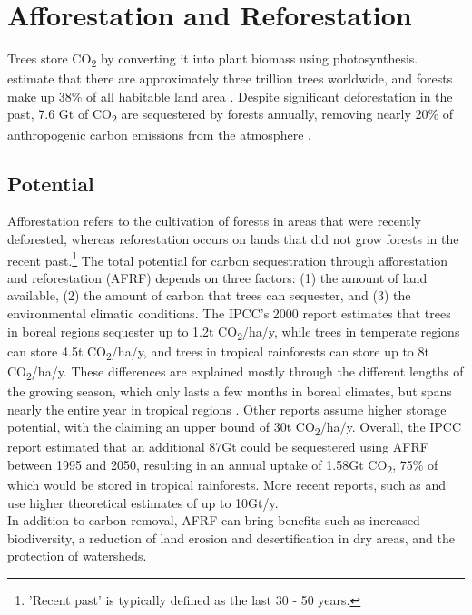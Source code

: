 \section{Afforestation and Reforestation}
Trees store CO\textsubscript{2} by converting it into plant biomass using photosynthesis. \textcite{Crowther2015MappingScale} estimate that there are approximately three trillion trees worldwide, and forests make up 38\% of all habitable land area \parencite{RitchieHowForested}. Despite significant deforestation in the past, 7.6 Gt of CO\textsubscript{2} are sequestered by forests annually, removing nearly 20\% of anthropogenic carbon emissions from the atmosphere \parencite{Harris2021GlobalFluxes}.
\subsection*{Potential}
Afforestation refers to the cultivation of forests in areas that were recently deforested, whereas reforestation occurs on lands that did not grow forests in the recent past.\footnote{'Recent past' is typically defined as the last 30 - 50 years.} The total potential for carbon sequestration through afforestation and reforestation (AFRF) depends on three factors: (1) the amount of land available, (2) the amount of carbon that trees can sequester, and (3) the environmental climatic conditions.
The IPCC's 2000 report estimates that trees in boreal regions sequester up to 1.2t CO\textsubscript{2}/ha/y, while trees in temperate regions can store 4.5t CO\textsubscript{2}/ha/y, and trees in tropical rainforests can store up to 8t CO\textsubscript{2}/ha/y. These differences are explained mostly through the different lengths of the growing season, which only lasts a few months in boreal climates, but spans nearly the entire year in tropical regions \parencite{Watson2000LandForestry}. Other reports assume higher storage potential, with the \textcite{NationalAcademiesofSciences2018NegativeAgenda} claiming an upper bound of 30t CO\textsubscript{2}/ha/y. Overall, the IPCC report estimated that an additional 87Gt could be sequestered using AFRF between 1995 and 2050, resulting in an annual uptake of 1.58Gt CO\textsubscript{2}, 75\% of which would be stored in tropical rainforests. More recent reports, such as \textcite{Fuss2018NegativeEffects} and \textcite{Griscom2017NaturalSolutions} use higher theoretical estimates of up to 10Gt/y.\\
In addition to carbon removal, AFRF can bring benefits such as increased biodiversity, a reduction of land erosion and desertification in dry areas, and the protection of watersheds. \parencite{Watson2000LandForestry}
